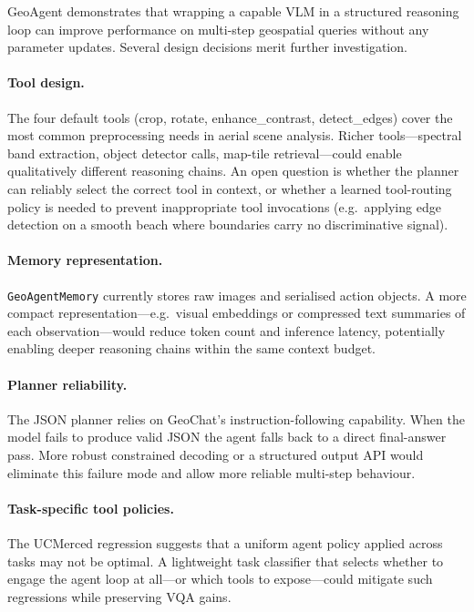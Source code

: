 \documentclass{article}
\begin{document}
GeoAgent demonstrates that wrapping a capable VLM in a structured reasoning loop
can improve performance on multi-step geospatial queries without any parameter
updates.  Several design decisions merit further investigation.

\paragraph{Tool design.}
The four default tools (crop, rotate, enhance\_contrast, detect\_edges) cover the
most common preprocessing needs in aerial scene analysis.  Richer tools---spectral
band extraction, object detector calls, map-tile retrieval---could enable
qualitatively different reasoning chains.  An open question is whether the planner
can reliably select the correct tool in context, or whether a learned tool-routing
policy is needed to prevent inappropriate tool invocations (e.g.\ applying edge
detection on a smooth beach where boundaries carry no discriminative signal).

\paragraph{Memory representation.}
\texttt{GeoAgentMemory} currently stores raw images and serialised action objects.
A more compact representation---e.g.\ visual embeddings or compressed text
summaries of each observation---would reduce token count and inference latency,
potentially enabling deeper reasoning chains within the same context budget.

\paragraph{Planner reliability.}
The JSON planner relies on GeoChat's instruction-following capability.  When the
model fails to produce valid JSON the agent falls back to a direct final-answer
pass.  More robust constrained decoding or a structured output API would eliminate
this failure mode and allow more reliable multi-step behaviour.

\paragraph{Task-specific tool policies.}
The UCMerced regression suggests that a uniform agent policy applied across tasks
may not be optimal.  A lightweight task classifier that selects whether to engage
the agent loop at all---or which tools to expose---could mitigate such regressions
while preserving VQA gains.
\end{document}
